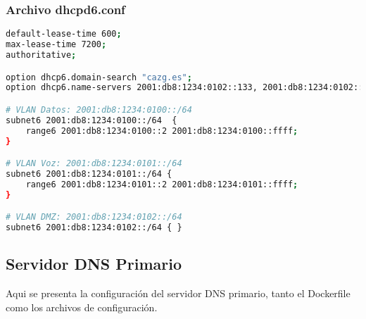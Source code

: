 \subsubsection{Archivo dhcpd6.conf}
\label{Apendice2:dhcpd6.conf}
\begin{lstlisting}[language=bash]
default-lease-time 600;
max-lease-time 7200;
authoritative;

option dhcp6.domain-search "cazg.es";
option dhcp6.name-servers 2001:db8:1234:0102::133, 2001:db8:1234:0102::134;

# VLAN Datos: 2001:db8:1234:0100::/64
subnet6 2001:db8:1234:0100::/64  {
    range6 2001:db8:1234:0100::2 2001:db8:1234:0100::ffff;
}

# VLAN Voz: 2001:db8:1234:0101::/64
subnet6 2001:db8:1234:0101::/64 {
    range6 2001:db8:1234:0101::2 2001:db8:1234:0101::ffff;
}

# VLAN DMZ: 2001:db8:1234:0102::/64
subnet6 2001:db8:1234:0102::/64 { }
\end{lstlisting}

\subsection{Servidor DNS Primario}
Aqui se presenta la configuración del servidor DNS primario, tanto el Dockerfile como los archivos de configuración.

